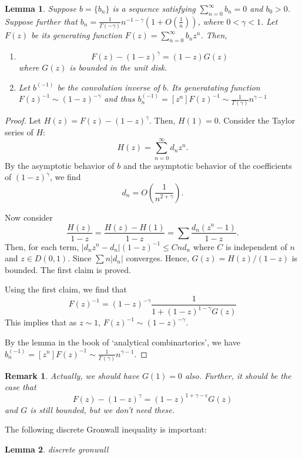 \documentclass[11pt]{article} %
\newtheorem{lmm}{Lemma}
\newtheorem{rmk}{Remark}
\begin{document}
\begin{lmm}
Suppose $b=\{b_n\}$ is a sequence satisfying $\sum_{n=0}^{\infty}b_n=0$
and $b_0>0$. Suppose further that $b_n=\frac{1}{\Gamma(-\gamma)}n^{-1-\gamma}(1+O(\frac{1}{n}))$, where $0<\gamma<1$. Let $F(z)$ be its generating function $F(z)=\sum_{n=0}^{\infty}b_n z^n$. Then, 
\begin{enumerate}
\item $$
F(z)-(1-z)^{\gamma}=(1-z)G(z)
$$
where $G(z)$ is bounded in the unit disk.
\item Let $b^{(-1)}$ be the convolution inverse of $b$. Its generatating function $F(z)^{-1}\sim (1-z)^{-\gamma}$ and thus $b^{(-1)}_n=[z^n]F(z)^{-1}\sim \frac{1}{\Gamma(\gamma)}n^{\gamma-1}$ 
\end{enumerate}
\end{lmm}
\begin{proof}
Let $H(z)=F(z)-(1-z)^{\gamma}$. Then, $H(1)=0$. Consider the Taylor series of $H$: $$
H(z)=\sum_{n=0}^{\infty}d_n z^n.
$$
By the asymptotic behavior of $b$ and the asymptotic behavior of the coefficients of $(1-z)^{\gamma}$, we find
$$d_n=O(\frac{1}{n^{2+\gamma}}).$$ 

Now consider $$
\frac{H(z)}{1-z}=\frac{H(z)-H(1)}{1-z}=\sum \frac{d_n(z^n-1)}{1-z}.
$$
Then, for each term, 
$|d_nz^n-d_n|(1-z)^{-1}\le Cnd_n$ where $C$ is independent of $n$ and $z\in D(0,1)$. Since $\sum n|d_n|$ converges. Hence, $G(z)=H(z)/(1-z)$ is bounded. The first claim is proved.


Using the first claim, we find that $$
F(z)^{-1}=(1-z)^{-\gamma}\frac{1}{1+(1-z)^{1-\gamma}G(z)}
$$
This implies that as $z\sim 1$, $F(z)^{-1}\sim (1-z)^{-\gamma}$.

By the lemma in the book of `analytical combinartorics', we have 
$b^{(-1)}_n=[z^n]F(z)^{-1}\sim \frac{1}{\Gamma(\gamma)}n^{\gamma-1}$.
\end{proof}
\begin{rmk}
Actually, we should have $G(1)=0$ also. Further, it should be the case that 
$$
F(z)-(1-z)^{\gamma}=(1-z)^{1+\gamma-\epsilon}G(z)
$$
and $G$ is still bounded, but we don't need these.
\end{rmk}

The following discrete Gronwall inequality is important:
\begin{lmm}
discrete gronwall
\end{lmm}
\end{document}
